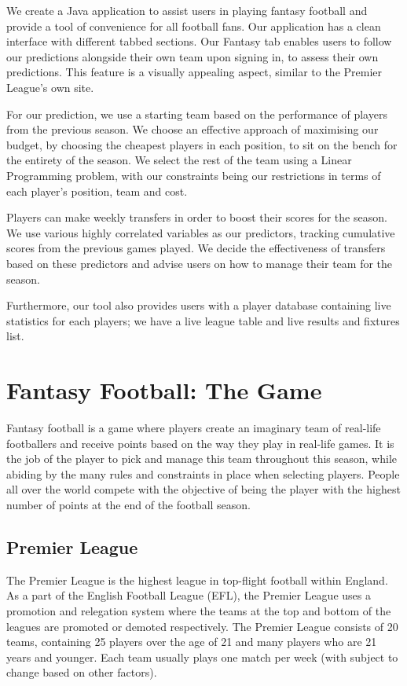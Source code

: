 \documentclass[12pt, a4paper, oneside]{book}
\numberwithin{equation}{section}
\begin{document}
We create a Java application to assist users in playing fantasy football and provide a tool of convenience for all football fans. Our application has a clean interface with different tabbed sections. Our Fantasy tab enables users to follow our predictions alongside their own team upon signing in, to assess their own predictions. This feature is a visually appealing aspect, similar to the Premier League's own site.

For our prediction, we use a starting team based on the performance of players from the previous season. We choose an effective approach of maximising our budget, by choosing the cheapest players in each position, to sit on the bench for the entirety of the season. We select the rest of the team using a Linear Programming problem, with our constraints being our restrictions in terms of each player's position, team and cost.

Players can make weekly transfers in order to boost their scores for the season. We use various highly correlated variables as our predictors, tracking cumulative scores from the previous games played. We decide the effectiveness of transfers based on these predictors and advise users on how to manage their team for the season.

Furthermore, our tool also provides users with a player database containing live statistics for each players; we have a live league table and live results and fixtures list.


\chapter{Fantasy Football: The Game}\label{ch:2}

Fantasy football is a game where players create an imaginary team of real-life footballers and receive points based on the way they play in real-life games. It is the job of the player to pick and manage this team throughout this season, while abiding by the many rules and constraints in place when selecting players. People all over the world compete with the objective of being the player with the highest number of points at the end of the football season.

\section{Premier League}\label{sec:2.1}

The Premier League is the highest league in top-flight football within England. As a part of the English Football League (EFL), the Premier League uses a promotion and relegation system where the teams at the top and bottom of the leagues are promoted or demoted respectively. The Premier League consists of 20 teams, containing 25 players over the age of 21 and many players who are 21 years and younger. Each team usually plays one match per week (with subject to change based on other factors).
\end{document}
